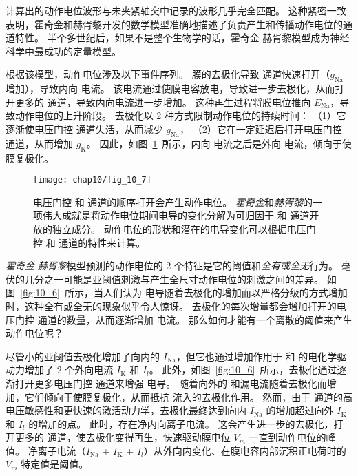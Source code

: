 计算出的动作电位波形与未夹紧轴突中记录的波形几乎完全匹配。
这种紧密一致表明，霍奇金和赫胥黎开发的数学模型准确地描述了负责产生和传播动作电位的通道特性。
半个多世纪后，如果不是整个生物学的话，霍奇金-赫胥黎模型成为神经科学中最成功的定量模型。


根据该模型，动作电位涉及以下事件序列。
膜的去极化导致  通道快速打开（$g_\text{Na}$ 增加），导致内向  电流。
该电流通过使膜电容放电，导致进一步去极化，从而打开更多的  通道，导致内向电流进一步增加。 
这种再生过程将膜电位推向 $E_{\text{Na}}$，导致动作电位的上升阶段。
去极化以 2 种方式限制动作电位的持续时间：
（1）它逐渐使电压门控  通道失活，从而减少 $g_\text{Na}$，
（2）它在一定延迟后打开电压门控  通道，从而增加 $g_\text{K}$。
因此，如图~\ref{fig:10_7}~所示，内向  电流之后是外向  电流，倾向于使膜复极化。


\begin{figure}[htbp]
	\centering
	\texttt{[image: chap10/fig\_10\_7]}
	\caption{电压门控  和  通道的顺序打开会产生动作电位。
		\textit{霍奇金}和\textit{赫胥黎}的一项伟大成就是将动作电位期间电导的变化分解为可归因于  和  通道开放的独立成分。
		动作电位的形状和潜在的电导变化可以根据电压门控  和  通道的特性来计算\cite{hille1978ionic}。}
	\label{fig:10_7}
\end{figure}


\textit{霍奇金}-\textit{赫胥黎}模型预测的动作电位的 2 个特征是它的阈值和\textit{全有或全无}行为。
毫伏的几分之一可能是亚阈值刺激与产生全尺寸动作电位的刺激之间的差异。
如图~\ref{fig:10_6}~所示，当人们认为  电导随着去极化的增加而以严格分级的方式增加时，这种全有或全无的现象似乎令人惊讶。 
去极化的每次增量都会增加打开的电压门控  通道的数量，从而逐渐增加  电流。
那么如何才能有一个离散的阈值来产生动作电位呢？


尽管小的亚阈值去极化增加了向内的 $I_\text{Na}$，但它也通过增加作用于  和  的电化学驱动力增加了 2 个外向电流 $I_\text{K}$ 和 $I_l$。
此外，如图~\ref{fig:10_6}~所示，去极化通过逐渐打开更多电压门控  通道来增强  电导。
随着向外的  和漏电流随着去极化而增加，它们倾向于使膜复极化，从而抵抗  流入的去极化作用。
然而，由于  通道的高电压敏感性和更快速的激活动力学，去极化最终达到向内 $I_\text{Na}$ 的增加超过向外 $I_\text{K}$ 和 $I_l$ 的增加的点。
此时，存在净内向离子电流。
这会产生进一步的去极化，打开更多的  通道，使去极化变得再生，快速驱动膜电位 $V_m$ 一直到动作电位的峰值。
净离子电流（$I_\text{Na}$ + $I_\text{K}$ + $I_l$）从外向内变化、在膜电容内部沉积正电荷时的 $V_m$ 特定值是阈值。


